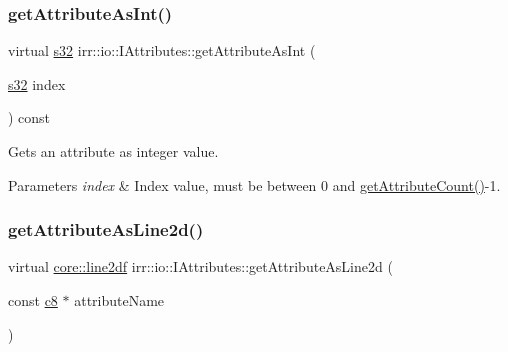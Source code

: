 \subsubsection{\texorpdfstring{get\+Attribute\+As\+Int()}{getAttributeAsInt()}\hspace{0.1cm}{\footnotesize\ttfamily [2/2]}}
{\footnotesize\ttfamily virtual \hyperlink{namespaceirr_ac66849b7a6ed16e30ebede579f9b47c6}{s32} irr\+::io\+::\+I\+Attributes\+::get\+Attribute\+As\+Int (\begin{DoxyParamCaption}\item[{\hyperlink{namespaceirr_ac66849b7a6ed16e30ebede579f9b47c6}{s32}}]{index }\end{DoxyParamCaption}) const\hspace{0.3cm}{\ttfamily [pure virtual]}}



Gets an attribute as integer value. 


\begin{DoxyParams}{Parameters}
{\em index} & Index value, must be between 0 and \hyperlink{classirr_1_1io_1_1IAttributes_a796bdd9440ee7ba0b6742a90a82870b6}{get\+Attribute\+Count()}-\/1. \\
\hline
\end{DoxyParams}
\mbox{\label{classirr_1_1io_1_1IAttributes_ace0d40cce5fad56cbe030d63c5743854}} 
\subsubsection{\texorpdfstring{get\+Attribute\+As\+Line2d()}{getAttributeAsLine2d()}\hspace{0.1cm}{\footnotesize\ttfamily [1/2]}}
{\footnotesize\ttfamily virtual \hyperlink{namespaceirr_1_1core_a19bbe2f8741053a37be916e9ea42e456}{core\+::line2df} irr\+::io\+::\+I\+Attributes\+::get\+Attribute\+As\+Line2d (\begin{DoxyParamCaption}\item[{const \hyperlink{namespaceirr_a9395eaea339bcb546b319e9c96bf7410}{c8} $\ast$}]{attribute\+Name }\end{DoxyParamCaption})\hspace{0.3cm}{\ttfamily [pure virtual]}}



